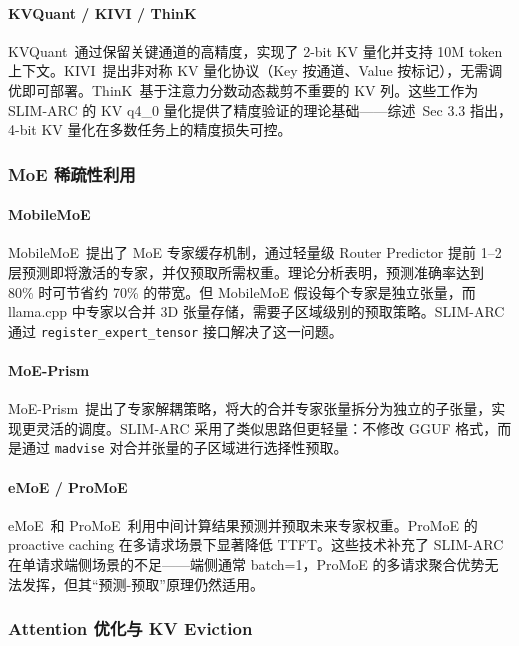 \paragraph{KVQuant / KIVI / ThinK}
KVQuant~\cite{kvquant2024}通过保留关键通道的高精度，实现了 2-bit KV 量化并支持 10M token 上下文。KIVI~\cite{kivi2024}提出非对称 KV 量化协议（Key 按通道、Value 按标记），无需调优即可部署。ThinK~\cite{think2024}基于注意力分数动态裁剪不重要的 KV 列。这些工作为 SLIM-ARC 的 KV q4\_0 量化提供了精度验证的理论基础——综述~\cite{survey2026}Sec 3.3 指出，4-bit KV 量化在多数任务上的精度损失可控。

\subsubsection{MoE 稀疏性利用}

\paragraph{MobileMoE}
MobileMoE~\cite{mobilemoe2024}提出了 MoE 专家缓存机制，通过轻量级 Router Predictor 提前 1--2 层预测即将激活的专家，并仅预取所需权重。理论分析表明，预测准确率达到 80\% 时可节省约 70\% 的带宽。但 MobileMoE 假设每个专家是独立张量，而 llama.cpp 中专家以合并 3D 张量存储，需要子区域级别的预取策略。SLIM-ARC 通过 \texttt{register\_expert\_tensor} 接口解决了这一问题。

\paragraph{MoE-Prism}
MoE-Prism~\cite{moeprism2024}提出了专家解耦策略，将大的合并专家张量拆分为独立的子张量，实现更灵活的调度。SLIM-ARC 采用了类似思路但更轻量：不修改 GGUF 格式，而是通过 \texttt{madvise} 对合并张量的子区域进行选择性预取。

\paragraph{eMoE / ProMoE}
eMoE~\cite{emoe2025}和 ProMoE~\cite{promoe2025}利用中间计算结果预测并预取未来专家权重。ProMoE 的 proactive caching 在多请求场景下显著降低 TTFT。这些技术补充了 SLIM-ARC 在单请求端侧场景的不足——端侧通常 batch=1，ProMoE 的多请求聚合优势无法发挥，但其“预测-预取”原理仍然适用。

\subsubsection{Attention 优化与 KV Eviction}

